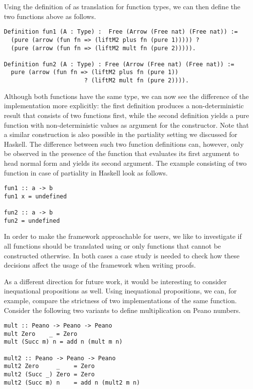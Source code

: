 Using the definition of  as translation for function types, we can then define the two functions above as follows.

\begin{verbatim}
Definition fun1 (A : Type) :  Free (Arrow (Free nat) (Free nat)) :=
  (pure (arrow (fun fn => (liftM2 plus fn (pure 1))))) ?
  (pure (arrow (fun fn => (liftM2 mult fn (pure 2))))).

Definition fun2 (A : Type) : Free (Arrow (Free nat) (Free nat)) :=
  pure (arrow (fun fn => (liftM2 plus fn (pure 1))
                       ? (liftM2 mult fn (pure 2)))).
\end{verbatim}

Although both functions have the same type, we can now see the difference of the implementation more explicitly: the first definition produces a non-deterministic result that consists of two functions first, while the second definition yields a pure function with non-deterministic values as argument for the  constructor.
Note that a similar construction is also possible in the partiality setting we discussed for Haskell.
The difference between such two function definitions can, however, only be observed in the presence of the function  that evaluates its first argument to head normal form and yields its second argument.
The example consisting of two function in case of partiality in Haskell look as follows.

\begin{verbatim}
fun1 :: a -> b
fun1 x = undefined

fun2 :: a -> b
fun2 = undefined
\end{verbatim}

In order to make the framework approachable for users, we like to investigate if all functions should be translated using  or only functions that cannot be constructed otherwise.
In both cases a case study is needed to check how these decisions affect the usage of the framework when writing proofs.

As a different direction for future work, it would be interesting to consider inequational propositions as well.
Using inequational propositions, we can, for example, compare the strictness of two implementations of the same function.
Consider the following two variants to define multiplication on Peano numbers.

\begin{verbatim}
mult :: Peano -> Peano -> Peano
mult Zero    _ = Zero
mult (Succ m) n = add n (mult m n)

mult2 :: Peano -> Peano -> Peano
mult2 Zero     _    = Zero
mult2 (Succ _) Zero = Zero
mult2 (Succ m) n    = add n (mult2 m n)
\end{verbatim}

